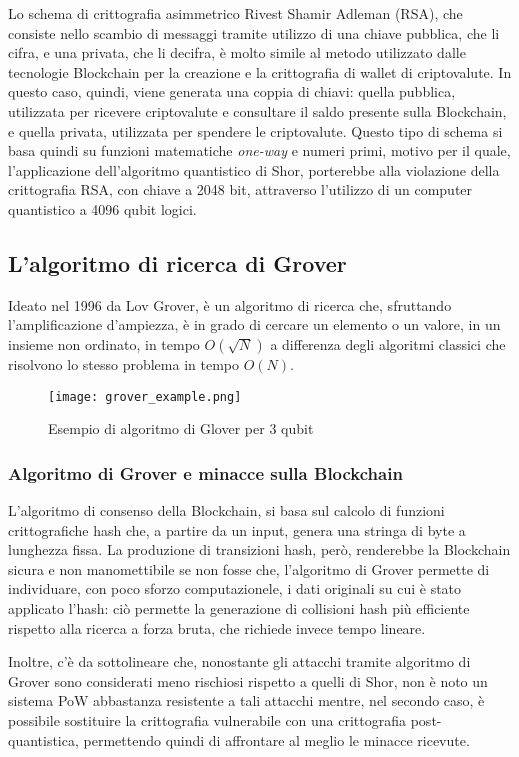 Lo schema di crittografia asimmetrico Rivest Shamir Adleman (RSA), che consiste nello scambio di messaggi tramite utilizzo di una chiave pubblica, che li cifra, e una privata, che li decifra, è molto simile al metodo utilizzato dalle tecnologie Blockchain per la creazione e la crittografia di wallet di criptovalute. In questo caso, quindi, viene generata una coppia di chiavi: quella pubblica, utilizzata per ricevere criptovalute e consultare il saldo presente sulla Blockchain, e quella privata, utilizzata per spendere le criptovalute. Questo tipo di schema si basa quindi su funzioni matematiche \textit{one-way} e numeri primi, motivo per il quale, l'applicazione dell'algoritmo quantistico di Shor, porterebbe alla violazione della crittografia RSA, con chiave a 2048 bit, attraverso l'utilizzo di un computer quantistico a 4096 qubit logici.

\subsection{L'algoritmo di ricerca di Grover}
Ideato nel 1996 da Lov Grover, è un algoritmo di ricerca che, sfruttando l'amplificazione d'ampiezza, è in grado di cercare un elemento o un valore, in un insieme non ordinato, in tempo \(O\left(\sqrt{N}\right)\) a differenza degli algoritmi classici che risolvono lo stesso problema in tempo \(O\left(N\right)\).

\begin{figure}[h]
  \centering
  \texttt{[image: grover\_example.png]}
  \caption{Esempio di algoritmo di Glover per 3 qubit}
  \label{fig:grover_example}
\end{figure}

\subsubsection{Algoritmo di Grover e minacce sulla Blockchain}
L'algoritmo di consenso della Blockchain, si basa sul calcolo di funzioni
crittografiche hash che, a partire da un input, genera una stringa di byte a lunghezza fissa. La produzione di transizioni hash, però, renderebbe la Blockchain sicura e non manomettibile se non fosse che, l'algoritmo di Grover permette di individuare, con poco sforzo computazionele, i dati originali su cui è stato applicato l'hash: ciò permette la generazione di collisioni hash più efficiente rispetto alla ricerca a forza bruta, che richiede invece tempo lineare.

Inoltre, c'è da sottolineare che, nonostante gli attacchi tramite algoritmo di Grover sono considerati meno rischiosi rispetto a quelli di Shor, non è noto un sistema PoW abbastanza resistente a tali attacchi mentre, nel secondo caso, è possibile sostituire la crittografia vulnerabile con una crittografia post-quantistica, permettendo quindi di affrontare al meglio le minacce ricevute.